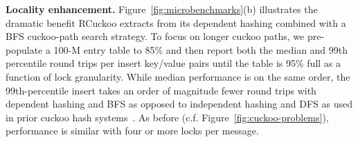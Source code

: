 \textbf{Locality enhancement.}
Figure~\ref{fig:microbenchmarks}(b) illustrates the dramatic benefit
RCuckoo extracts from its dependent hashing combined with a BFS
cuckoo-path search strategy.  To focus on longer cuckoo paths, we
pre-populate a 100-M entry table to 85\% and then report both the median
and 99th percentile round trips per insert 
key/value pairs until the table is 95\% full as a function of lock
granularity.  While median performance is on the same order, the
99th-percentile insert takes an order of magnitude fewer round trips
with dependent hashing and BFS as opposed to independent hashing and
DFS as used in prior cuckoo hash
systems~\cite{cuckoo-improvements,pilaf,cuckoo}.  As before
(c.f. Figure~\ref{fig:cuckoo-problems}), performance is similar with
four or more locks per message.






